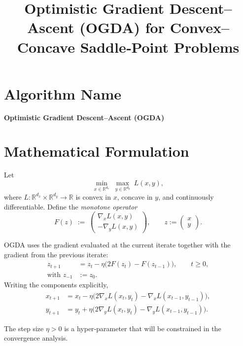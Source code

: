 \documentclass{article}
\begin{document}
\title{Optimistic Gradient Descent--Ascent (OGDA) for Convex–Concave Saddle‑Point Problems}
\author{}
\date{}
\maketitle

\section*{Algorithm Name}
\textbf{Optimistic Gradient Descent–Ascent (OGDA)}  

\section*{Mathematical Formulation}
Let 
\[
\min_{x\in\mathbb{R}^{d_x}}\;\max_{y\in\mathbb{R}^{d_y}} \;L(x,y),
\]
where $L:\mathbb{R}^{d_x}\times\mathbb{R}^{d_y}\rightarrow\mathbb{R}$ is convex in $x$, concave in $y$, and continuously differentiable.  
Define the \emph{monotone operator}
\[
F(z)\;:=\;
\begin{pmatrix}
\nabla_{x}L(x,y)\\[2mm]
-\nabla_{y}L(x,y)
\end{pmatrix},
\qquad 
z:=\begin{pmatrix}x\\y\end{pmatrix}.
\]

OGDA uses the gradient evaluated at the current iterate together with the gradient from the previous iterate:
\[
\boxed{
\begin{aligned}
z_{t+1}&=z_{t}-\eta\bigl(2F(z_{t})-F(z_{t-1})\bigr),\qquad t\ge 0,\\
\text{with }z_{-1}&:=z_{0}.
\end{aligned}}
\]
Writing the components explicitly,
\[
\begin{aligned}
x_{t+1}&=x_{t}-\eta\bigl(2\nabla_{x}L(x_{t},y_{t})-\nabla_{x}L(x_{t-1},y_{t-1})\bigr),\\
y_{t+1}&=y_{t}+\eta\bigl(2\nabla_{y}L(x_{t},y_{t})-\nabla_{y}L(x_{t-1},y_{t-1})\bigr).
\end{aligned}
\]

The step size $\eta>0$ is a hyper‑parameter that will be constrained in the convergence analysis.

\end{document}
